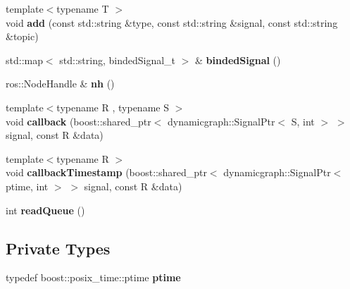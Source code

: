 \begin{DoxyCompactItemize}
\item 
{\footnotesize template$<$typename T $>$ }\\void {\bfseries add} (const std\+::string \&type, const std\+::string \&signal, const std\+::string \&topic)\hypertarget{classdynamic__graph_1_1RosQueuedSubscribe_ad676b92e3c68923c36e0794df9a36b07}{}\label{classdynamic__graph_1_1RosQueuedSubscribe_ad676b92e3c68923c36e0794df9a36b07}

\item 
std\+::map$<$ std\+::string, binded\+Signal\+\_\+t $>$ \& {\bfseries binded\+Signal} ()\hypertarget{classdynamic__graph_1_1RosQueuedSubscribe_ab6a37292689cb3798d9348561a2b6796}{}\label{classdynamic__graph_1_1RosQueuedSubscribe_ab6a37292689cb3798d9348561a2b6796}

\item 
ros\+::\+Node\+Handle \& {\bfseries nh} ()\hypertarget{classdynamic__graph_1_1RosQueuedSubscribe_a2e5ddc40978683c8c5ee5e1a6758aa22}{}\label{classdynamic__graph_1_1RosQueuedSubscribe_a2e5ddc40978683c8c5ee5e1a6758aa22}

\item 
{\footnotesize template$<$typename R , typename S $>$ }\\void {\bfseries callback} (boost\+::shared\+\_\+ptr$<$ dynamicgraph\+::\+Signal\+Ptr$<$ S, int $>$ $>$ signal, const R \&data)\hypertarget{classdynamic__graph_1_1RosQueuedSubscribe_afe57f995f66aa7bbf5d006e876cdbd66}{}\label{classdynamic__graph_1_1RosQueuedSubscribe_afe57f995f66aa7bbf5d006e876cdbd66}

\item 
{\footnotesize template$<$typename R $>$ }\\void {\bfseries callback\+Timestamp} (boost\+::shared\+\_\+ptr$<$ dynamicgraph\+::\+Signal\+Ptr$<$ ptime, int $>$ $>$ signal, const R \&data)\hypertarget{classdynamic__graph_1_1RosQueuedSubscribe_acfb7c66275aa4680cf0c6b40edeabb9d}{}\label{classdynamic__graph_1_1RosQueuedSubscribe_acfb7c66275aa4680cf0c6b40edeabb9d}

\item 
int {\bfseries read\+Queue} ()\hypertarget{classdynamic__graph_1_1RosQueuedSubscribe_a274d716f1f8fdba71963dd04db0fefd4}{}\label{classdynamic__graph_1_1RosQueuedSubscribe_a274d716f1f8fdba71963dd04db0fefd4}

\end{DoxyCompactItemize}
\subsection*{Private Types}
\begin{DoxyCompactItemize}
\item 
typedef boost\+::posix\+\_\+time\+::ptime {\bfseries ptime}\hypertarget{classdynamic__graph_1_1RosQueuedSubscribe_a78091d9cf016f41283ca5a793b9cd486}{}\label{classdynamic__graph_1_1RosQueuedSubscribe_a78091d9cf016f41283ca5a793b9cd486}

\end{DoxyCompactItemize}
